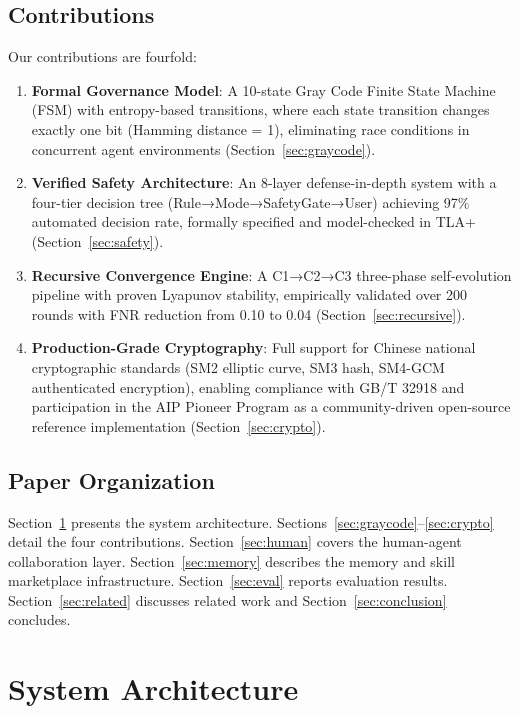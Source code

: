\documentclass[11pt,a4paper]{article}
\begin{document}
\subsection{Contributions}

Our contributions are fourfold:

\begin{enumerate}
  \item \textbf{Formal Governance Model}: A 10-state Gray Code Finite State Machine (FSM) with entropy-based transitions, where each state transition changes exactly one bit (Hamming distance = 1), eliminating race conditions in concurrent agent environments (Section~\ref{sec:graycode}).
  \item \textbf{Verified Safety Architecture}: An 8-layer defense-in-depth system with a four-tier decision tree (Rule→Mode→SafetyGate→User) achieving 97\% automated decision rate, formally specified and model-checked in TLA+ (Section~\ref{sec:safety}).
  \item \textbf{Recursive Convergence Engine}: A C1→C2→C3 three-phase self-evolution pipeline with proven Lyapunov stability, empirically validated over 200 rounds with FNR reduction from 0.10 to 0.04 (Section~\ref{sec:recursive}).
  \item \textbf{Production-Grade Cryptography}: Full support for Chinese national cryptographic standards (SM2 elliptic curve, SM3 hash, SM4-GCM authenticated encryption), enabling compliance with GB/T 32918 and participation in the AIP Pioneer Program as a community-driven open-source reference implementation (Section~\ref{sec:crypto}).
\end{enumerate}

\subsection{Paper Organization}

Section~\ref{sec:arch} presents the system architecture. Sections~\ref{sec:graycode}--\ref{sec:crypto} detail the four contributions. Section~\ref{sec:human} covers the human-agent collaboration layer. Section~\ref{sec:memory} describes the memory and skill marketplace infrastructure. Section~\ref{sec:eval} reports evaluation results. Section~\ref{sec:related} discusses related work and Section~\ref{sec:conclusion} concludes.

\section{System Architecture}
\label{sec:arch}
\end{document}
